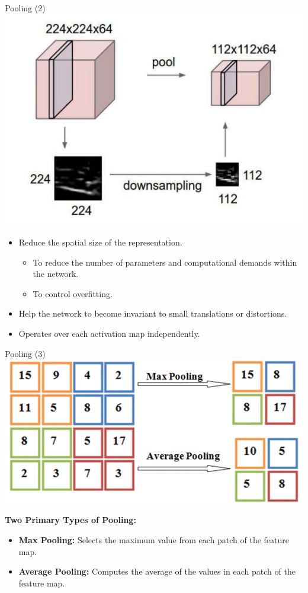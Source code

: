 \documentclass[default, aspectratio=169]{beamer}
\begin{document}
	\begin{frame}{Pooling (2)}
		\centering 
		\includegraphics[keepaspectratio, scale=0.4]{pic/pooling1.png}
		\smallskip
		\begin{itemize}
			\item Reduce the spatial size of the representation.
			\begin{itemize}
				\item To reduce the number of parameters and computational demands within the network.
				\item To control overfitting.
			\end{itemize}
			\item Help the network to become invariant to small translations or distortions.
			\item Operates over each activation map independently.
		\end{itemize}
		
	\end{frame}
	\begin{frame}{Pooling (3)}
		\centering
		\includegraphics[keepaspectratio, scale=0.6]{pic/pooling2.png}
		\begin{flushleft}
			\textbf{Two Primary Types of Pooling:}
			\begin{itemize}		
				\item \textbf{Max Pooling:}  Selects the maximum value from each patch of the feature map.
				\item \textbf{Average Pooling:} Computes the average of the values in each patch of the feature map.
			\end{itemize}
		\end{flushleft}
	\end{frame}
\end{document}
